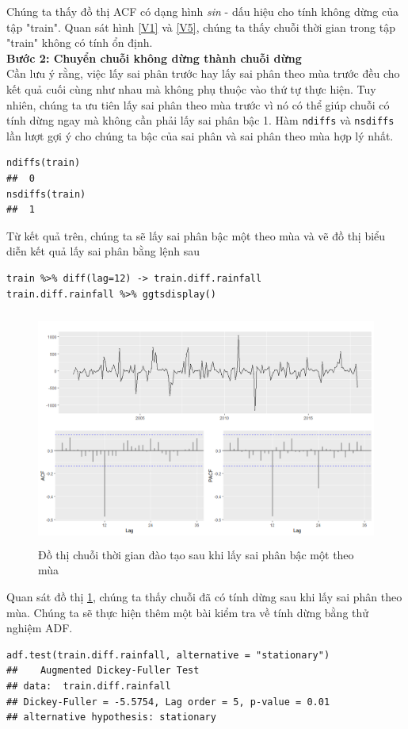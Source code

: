 \documentclass[12pt, a4paper,oneside]{book}
\theoremstyle{definition}
\begin{document}
Chúng ta thấy đồ thị ACF có dạng hình \textit{sin} - dấu hiệu cho tính không dừng của tập "train". Quan sát hình \ref{V1} và \ref{V5}, chúng ta thấy chuỗi thời gian trong tập "train" không có tính ổn định.\\
\textbf{Bước 2: Chuyển chuỗi không dừng thành chuỗi dừng}\\
Cần lưu ý rằng, việc lấy sai phân trước hay lấy sai phân theo mùa trước đều cho kết quả cuối cùng như nhau mà không phụ thuộc vào thứ tự thực hiện. Tuy nhiên, chúng ta ưu tiên lấy sai phân theo mùa trước vì nó có thể giúp chuỗi có tính dừng ngay mà không cần phải lấy sai phân bậc 1. Hàm \lstinline{ndiffs} và \lstinline{nsdiffs} lần lượt gợi ý cho chúng ta bậc của sai phân và sai phân theo mùa hợp lý nhất.
\begin{lstlisting}
ndiffs(train)
##  0
nsdiffs(train)
##  1
\end{lstlisting}
Từ kết quả trên, chúng ta sẽ lấy sai phân bậc một theo mùa và vẽ đồ thị biểu diễn kết quả lấy sai phân bằng lệnh sau
\begin{lstlisting}
train %>% diff(lag=12) -> train.diff.rainfall
train.diff.rainfall %>% ggtsdisplay()
\end{lstlisting}
\begin{figure}[!htb]
	\centering
	\includegraphics[width=1\linewidth,height=7.7cm]{anh/V6}
	\vskip-4mm 
	\caption{Đồ thị chuỗi thời gian đào tạo sau khi lấy sai phân bậc một theo mùa}  
	\label{V6}
\end{figure}
Quan sát đồ thị \ref{V6}, chúng ta thấy chuỗi đã có tính dừng sau khi lấy sai phân theo mùa. Chúng ta sẽ thực hiện thêm một bài kiểm tra về tính dừng bằng thử nghiệm ADF. 
\begin{lstlisting}
adf.test(train.diff.rainfall, alternative = "stationary")
##	  Augmented Dickey-Fuller Test
## data:  train.diff.rainfall
## Dickey-Fuller = -5.5754, Lag order = 5, p-value = 0.01
## alternative hypothesis: stationary
\end{lstlisting}
\end{document}
